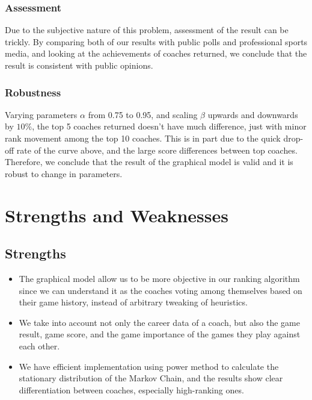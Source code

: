 \documentclass[titlepage]{article}
\begin{document}
\subsubsection*{Assessment}

\noindent Due to the subjective nature of this problem, assessment of the result can be trickly. By comparing both of our results with public polls and professional sports media, and looking at the achievements of coaches returned, we conclude that the result is consistent with public opinions.

\subsubsection*{Robustness}

\noindent Varying parameters $\alpha$ from 0.75 to 0.95, and scaling $\beta$ upwards and downwards by $10\%$, the top 5 coaches returned doesn't have much difference, just with minor rank movement among the top 10 coaches. This is in part due to the quick drop-off rate of the curve above, and the large score differences between top coaches. Therefore, we conclude that the result of the graphical model is valid and it is robust to change in parameters.

\section{Strengths and Weaknesses}

\subsection{Strengths}
\begin{itemize}
\item The graphical model allow us to be more objective in our ranking algorithm since we can understand it as the coaches voting among themselves based on their game history, instead of arbitrary tweaking of heuristics.

\item We take into account not only the career data of a coach, but also the game result, game score, and the game importance of the games they play against each other.

\item We have efficient implementation using power method to calculate the stationary distribution of the Markov Chain, and the results show clear differentiation between coaches, especially high-ranking ones.
\end{itemize}
\end{document}
